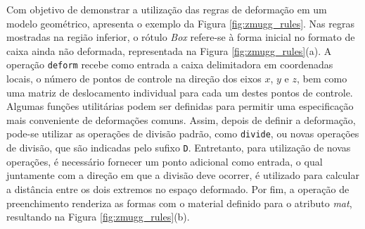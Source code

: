 \begin{figure}[h!]
	\centering
	\captionsetup{width=15cm}
	{}	
\end{figure}

\newpage

Com objetivo de demonstrar a utilização das regras de deformação em um modelo geométrico,  apresenta o exemplo da Figura \ref{fig:zmugg_rules}. Nas regras mostradas na região inferior, o rótulo \textit{Box} refere-se à forma inicial no formato de caixa ainda não deformada, representada na Figura \ref{fig:zmugg_rules}(a). A operação \texttt{deform} recebe como entrada a caixa delimitadora em coordenadas locais, o número de pontos de controle na direção dos eixos $x$, $y$ e $z$, bem como uma matriz de deslocamento individual para cada um destes pontos de controle. Algumas funções utilitárias podem ser definidas para permitir uma especificação mais conveniente de deformações comuns. Assim, depois de definir a deformação, pode-se utilizar as operações de divisão padrão, como \texttt{divide}, ou novas operações de divisão, que são indicadas pelo sufixo \texttt{D}. Entretanto, para utilização de novas operações, é necessário fornecer um ponto adicional como entrada, o qual juntamente com a direção em que a divisão deve ocorrer, é utilizado para calcular a distância entre os dois extremos no espaço deformado. Por fim, a operação de preenchimento renderiza as formas com o material definido para o atributo \textit{mat}, resultando na Figura \ref{fig:zmugg_rules}(b).

